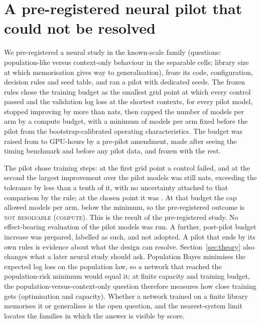 \section{A pre-registered neural pilot that could not be resolved}\label{sec:pilot}
We pre-registered a neural study in the known-scale family (questions: population-like versus context-only behaviour in the
separable cells; library size at which memorisation gives way to generalisation), froze its code, configuration,
decision rules and seed table, and ran a pilot with dedicated seeds. The frozen rules chose the training budget as the
smallest grid point at which every control passed and the validation log loss at the shortest contexts, for every pilot
model, stopped improving by more than \ConvTol nats, then capped the number of models per arm by a compute budget, with a
minimum of \MinModels models per arm fixed before the pilot from the bootstrap-calibrated operating characteristics. The
budget was raised from \CapBudgetHoursOriginal to \CapBudgetHours GPU-hours by a pre-pilot amendment, made after seeing the
timing benchmark and before any pilot data, and frozen with the rest.

The pilot chose \PilotB training steps: at the first grid point a control failed, and at the second the largest improvement
over the pilot models was still \PilotImprovementTwentyFive nats, exceeding the tolerance by less than a tenth of it, with no
uncertainty attached to that comparison by the rule; at the chosen point it was \PilotImprovementFifty. At that budget the cap
allowed \PilotCap models per arm, below the minimum, so the pre-registered outcome is \textsc{not resolvable (compute)}. This
is the result of the pre-registered study. No effect-bearing evaluation of the pilot models was run. A further, post-pilot
budget increase was prepared, labelled as such, and not adopted. A pilot that ends by its own rules is evidence about what
the design can resolve. Section~\ref{sec:theory} also changes what a later neural study should ask. Population Bayes
minimises the expected log loss on the population law, so a network that reached the population-risk minimum would equal it;
at finite capacity and training budget, the population-versus-context-only question therefore measures how close training
gets (optimisation and capacity). Whether a network trained on a finite library memorises it or generalises is the open
question, and the nearest-system limit locates the families in which the answer is visible by score.
